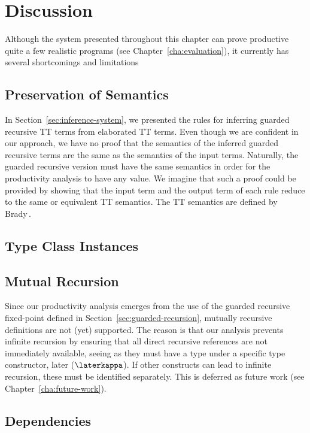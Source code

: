 \section{Discussion}
Although the system presented throughout this chapter can prove productive quite
a few realistic programs (see Chapter~\ref{cha:evaluation}), it currently has
several shortcomings and limitations

\subsection{Preservation of Semantics}
In Section~\ref{sec:inference-system}, we presented the rules for inferring
guarded recursive TT terms from elaborated TT terms. Even though we are
confident in our approach, we have no proof that the semantics of the inferred
guarded recursive terms are the same as the semantics of the input
terms. Naturally, the guarded recursive version must have the same semantics in
order for the productivity analysis to have any value. We imagine that such a
proof could be provided by showing that the input term and the output term of each
rule reduce to the same or equivalent TT semantics. The TT
semantics are defined by Brady\,\citep{BradyIdrisImpl13}.

\subsection{Type Class Instances}

\subsection{Mutual Recursion}
Since our productivity analysis emerges from the use of the guarded recursive
fixed-point defined in Section~\ref{sec:guarded-recursion}, mutually recursive
definitions are not (yet) supported. The reason is that our analysis prevents
infinite recursion by ensuring that all direct recursive references are not
immediately available, seeing as they must have a type under a specific type
constructor, later ($\laterkappa$). If other constructs can lead to infinite
recursion, these must be identified separately. This is deferred as future work
(see Chapter~\ref{cha:future-work}).

\subsection{Dependencies}

